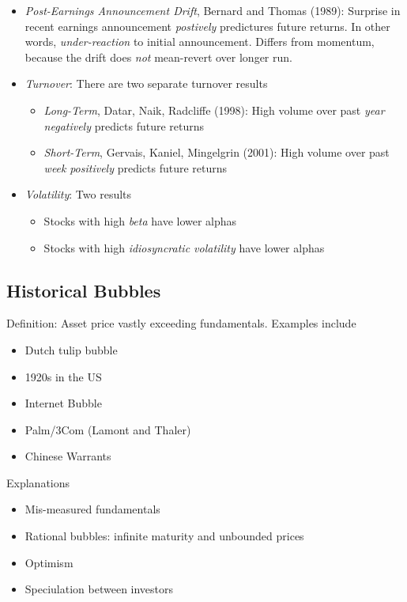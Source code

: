 \documentclass[12pt]{article}
\theoremstyle{plain}
\theoremstyle{definition}
\theoremstyle{remark}
\begin{document}
\begin{itemize}
  \item
    \emph{Post-Earnings Announcement Drift}, Bernard and Thomas (1989):
    Surprise in recent earnings announcement \emph{postively}
    predictures future returns.
    In other words, \emph{under-reaction} to initial announcement.
    Differs from momentum, because the drift does \emph{not} mean-revert
    over longer run.

  \item
    \emph{Turnover}:
    There are two separate turnover results
    \begin{itemize}
      \item \emph{Long-Term}, Datar, Naik, Radcliffe (1998):
        High volume over past \emph{year} \emph{negatively} predicts
        future returns
      \item \emph{Short-Term}, Gervais, Kaniel, Mingelgrin (2001):
        High volume over past \emph{week} \emph{positively} predicts
        future returns
    \end{itemize}

  \item
    \emph{Volatility}:
    Two results
    \begin{itemize}
      \item Stocks with high \emph{beta} have lower alphas
      \item Stocks with high \emph{idiosyncratic volatility} have lower alphas
    \end{itemize}
\end{itemize}



\subsection{Historical Bubbles}

Definition: Asset price vastly exceeding fundamentals.
Examples include
\begin{itemize}
  \item Dutch tulip bubble
  \item 1920s in the US
  \item Internet Bubble
  \item Palm/3Com (Lamont and Thaler)
  \item Chinese Warrants
\end{itemize}
Explanations
\begin{itemize}
  \item Mis-measured fundamentals
  \item Rational bubbles: infinite maturity and unbounded prices
  \item Optimism
  \item Speciulation between investors
\end{itemize}
\end{document}
